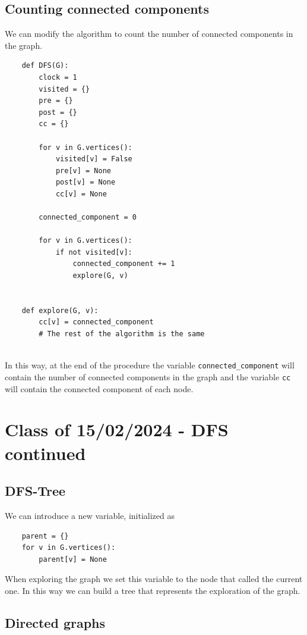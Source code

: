 \documentclass[10pt]{extarticle}
\begin{document}
\subsection{Counting connected components}

We can modify the algorithm to count the number of connected components in the graph.

\begin{verbatim}
    def DFS(G):
        clock = 1
        visited = {}
        pre = {}
        post = {}
        cc = {}

        for v in G.vertices():
            visited[v] = False
            pre[v] = None
            post[v] = None
            cc[v] = None

        connected_component = 0

        for v in G.vertices():
            if not visited[v]:
                connected_component += 1
                explore(G, v)


    def explore(G, v):
        cc[v] = connected_component
        # The rest of the algorithm is the same


\end{verbatim}

In this way, at the end of the procedure the variable \texttt{connected\_component} will contain the number of connected components in the graph
and the variable \texttt{cc} will contain the connected component of each node.

\section{Class of 15/02/2024 - DFS continued}

\subsection{DFS-Tree}

We can introduce a new variable, initialized as

\begin{verbatim}
    parent = {}
    for v in G.vertices():
        parent[v] = None
\end{verbatim}

When exploring the graph we set this variable to the node that called the current one.
In this way we can build a tree that represents the exploration of the graph.

\subsection{Directed graphs}
\end{document}
